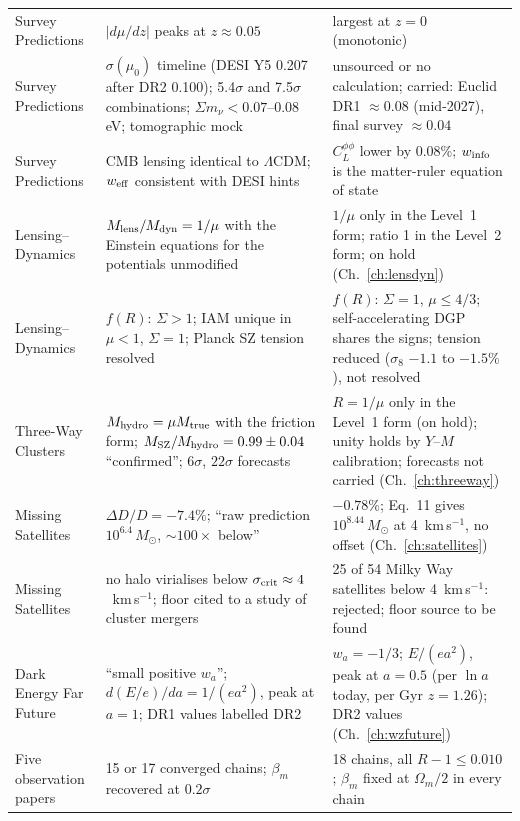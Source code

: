 {\begin{longtable}{@{}p{}p{}p{}@{}}
Survey Predictions & $|d\mu/dz|$ peaks at $z\approx0.05$ & largest at $z=0$ (monotonic) \\
Survey Predictions & $\sigma(\mu_0)$ timeline (DESI Y5 0.207 after DR2 0.100); 5.4$\sigma$ and 7.5$\sigma$ combinations; $\Sigma m_\nu<0.07$--$0.08$ eV; tomographic mock & unsourced or no calculation; carried: Euclid DR1 $\approx0.08$ (mid-2027), final survey $\approx0.04$ \\
Survey Predictions & CMB lensing identical to $\Lambda$CDM; $w_{\rm eff}$ consistent with DESI hints & $C_L^{\phi\phi}$ lower by 0.08\%; $w_{\rm info}$ is the matter-ruler equation of state \\
Lensing--Dynamics & $M_{\rm lens}/M_{\rm dyn}=1/\mu$ with the Einstein equations for the potentials unmodified & $1/\mu$ only in the Level~1 form; ratio 1 in the Level~2 form; on hold (Ch.~\ref{ch:lensdyn}) \\
Lensing--Dynamics & $f(R)$: $\Sigma>1$; IAM unique in $\mu<1$, $\Sigma=1$; Planck SZ tension resolved & $f(R)$: $\Sigma=1$, $\mu\le4/3$; self-accelerating DGP shares the signs; tension reduced ($\sigma_8$ $-1.1$ to $-1.5\%$), not resolved \\
Three-Way Clusters & $M_{\rm hydro}=\mu M_{\rm true}$ with the friction form; $M_{\rm SZ}/M_{\rm hydro}=0.99\pm0.04$ ``confirmed''; $6\sigma$, $22\sigma$ forecasts & $R=1/\mu$ only in the Level~1 form (on hold); unity holds by $Y$--$M$ calibration; forecasts not carried (Ch.~\ref{ch:threeway}) \\
Missing Satellites & $\Delta D/D=-7.4\%$; ``raw prediction $10^{6.4}\,M_\odot$, $\sim100\times$ below'' & $-0.78\%$; Eq.~11 gives $10^{8.44}\,M_\odot$ at 4~km\,s$^{-1}$, no offset (Ch.~\ref{ch:satellites}) \\
Missing Satellites & no halo virialises below $\sigma_{\rm crit}\approx4$~km\,s$^{-1}$; floor cited to a study of cluster mergers & 25 of 54 Milky Way satellites below 4~km\,s$^{-1}$: rejected; floor source to be found \\
Dark Energy Far Future & ``small positive $w_a$''; $d(E/e)/da=1/(ea^2)$, peak at $a=1$; DR1 values labelled DR2 & $w_a=-1/3$; $E/(ea^2)$, peak at $a=0.5$ (per $\ln a$ today, per Gyr $z=1.26$); DR2 values (Ch.~\ref{ch:wzfuture}) \\
Five observation papers & 15 or 17 converged chains; $\beta_m$ recovered at $0.2\sigma$ & 18 chains, all $R-1\le0.010$; $\beta_m$ fixed at $\Omega_m/2$ in every chain \\
\bottomrule
\end{longtable}}
